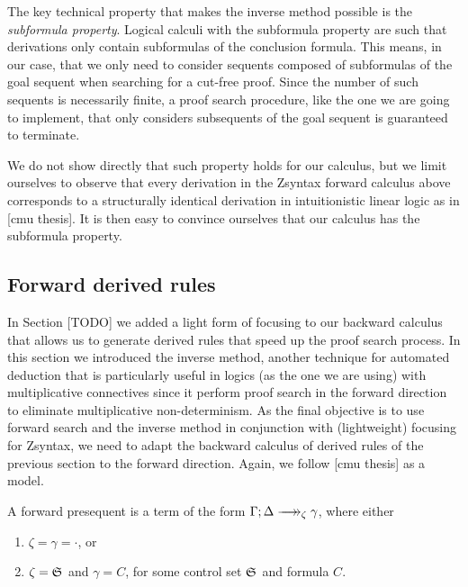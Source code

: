 The key technical property that makes the inverse method possible is the
\emph{subformula property}. Logical calculi with the subformula property are
such that derivations only contain subformulas of the conclusion formula. This
means, in our case, that we only need to consider sequents composed of
subformulas of the goal sequent when searching for a cut-free proof. Since the
number of such sequents is necessarily finite, a proof search procedure, like the
one we are going to implement, that only considers subsequents of the goal
sequent is guaranteed to terminate.

We do not show directly that such property holds for our calculus, but we limit
ourselves to observe that every derivation in the Zsyntax forward calculus above
corresponds to a structurally identical derivation in intuitionistic linear
logic as in [cmu thesis]. It is then easy to convince ourselves that our
calculus has the subformula property.

\subsection{Forward derived rules}

In Section [TODO] we added a light form of focusing to our backward calculus
that allows us to generate derived rules that speed up the proof search process.
In this section we introduced the inverse method, another technique for
automated deduction that is particularly useful in logics (as the one we are
using) with multiplicative connectives since it perform proof search in the
forward direction to eliminate multiplicative non-determinism. As the final
objective is to use forward search and the inverse method in conjunction with
(lightweight) focusing for Zsyntax, we need to adapt the backward calculus of
derived rules of the previous section to the forward direction. Again, we follow
[cmu thesis] as a model.

\begin{definition}
  A forward presequent is a term of the form
  $\zfneuseq{\Gamma}{\Delta}{\zeta}{\gamma}$, where either

  \begin{enumerate}
  \item $\zeta = \gamma = \cdot$, or
  \item $\zeta = \mathfrak{S}_{}$ and $\gamma = C$, for some control set $\mathfrak{S}_{}$
    and formula $C$.
  \end{enumerate}
\end{definition}

